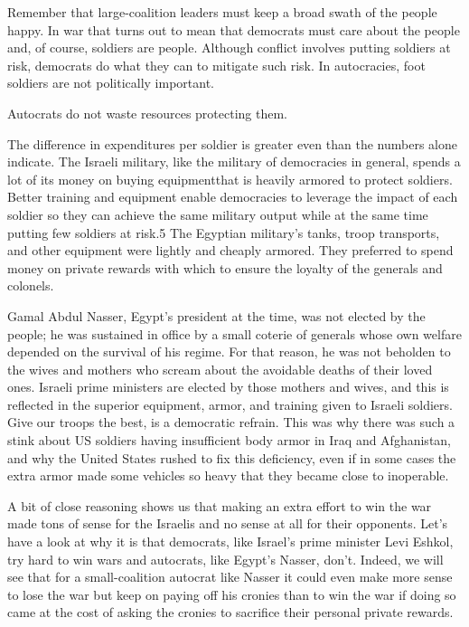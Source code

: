 \documentclass[10pt]{article}
\begin{document}
{\large Remember that large-coalition leaders must keep a broad swath of the
people happy. In war that turns out to mean that democrats must care about the
people and, of course, soldiers are people. Although conflict involves putting
soldiers at risk, democrats do what they can to mitigate such risk. In
autocracies, foot soldiers are not politically important.}

{\large Autocrats do not waste resources protecting them.}

{\large The difference in expenditures per soldier is greater even than the
numbers alone indicate. The Israeli military, like the military of democracies in
general, spends a lot of its money on buying equipmentthat is heavily armored to
protect soldiers. Better training and equipment enable democracies to leverage
the impact of each soldier so they can achieve the same military output while at
the same time putting few soldiers at risk.5 The Egyptian military's tanks, troop
transports, and other equipment were lightly and cheaply armored. They preferred
to spend money on private rewards with which to ensure the loyalty of the
generals and colonels.}

{\large Gamal Abdul Nasser, Egypt's president at the time, was not elected by
the people; he was sustained in office by a small coterie of generals whose own
welfare depended on the survival of his regime. For that reason, he was not
beholden to the wives and mothers who scream about the avoidable deaths of their
loved ones. Israeli prime ministers are elected by those mothers and wives, and
this is reflected in the superior equipment, armor, and training given to Israeli
soldiers. Give our troops the best, is a democratic refrain. This was why there
was such a stink about US soldiers having insufficient body armor in Iraq and
Afghanistan, and why the United States rushed to fix this deficiency, even if in
some cases the extra armor made some vehicles so heavy that they became close to
inoperable.}

{\large A bit of close reasoning shows us that making an extra effort to win the
war made tons of sense for the Israelis and no sense at all for their opponents.
Let's have a look at why it is that democrats, like Israel's prime minister Levi
Eshkol, try hard to win wars and autocrats, like Egypt's Nasser, don't. Indeed,
we will see that for a small-coalition autocrat like Nasser it could even make
more sense to lose the war but keep on paying off his cronies than to win the war
if doing so came at the cost of asking the cronies to sacrifice their personal
private rewards.}
\end{document}
